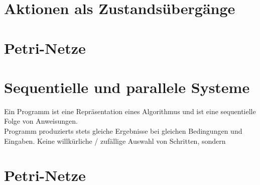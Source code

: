 \section{Aktionen als Zustandsübergänge}

\section{Petri-Netze}

\section{Sequentielle und parallele Systeme}
Ein Programm ist eine Repräsentation eines Algorithmus und ist eine sequentielle Folge von Anweisungen. \\
 Programm produzierts stets gleiche Ergebnisse bei gleichen Bedingungen und Eingaben.  Keine willkürliche / zufällige Auswahl von Schritten, sondern 

\section{Petri-Netze}



